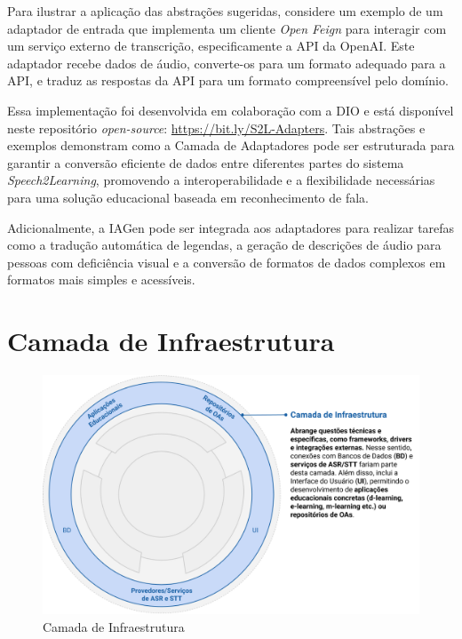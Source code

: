 Para ilustrar a aplicação das abstrações sugeridas, considere um exemplo de um adaptador de entrada que implementa um cliente \textit{Open Feign} para interagir com um serviço externo de transcrição, especificamente a API da OpenAI. Este adaptador recebe dados de áudio, converte-os para um formato adequado para a API, e traduz as respostas da API para um formato compreensível pelo domínio. 

Essa implementação foi desenvolvida em colaboração com a DIO e está disponível neste repositório \textit{open-source}: \url{https://bit.ly/S2L-Adapters}. Tais abstrações e exemplos demonstram como a Camada de Adaptadores pode ser estruturada para garantir a conversão eficiente de dados entre diferentes partes do sistema \textit{Speech2Learning}, promovendo a interoperabilidade e a flexibilidade necessárias para uma solução educacional baseada em reconhecimento de fala.

Adicionalmente, a IAGen pode ser integrada aos adaptadores para realizar tarefas como a tradução automática de legendas, a geração de descrições de áudio para pessoas com deficiência visual e a conversão de formatos de dados complexos em formatos mais simples e acessíveis.

\section{Camada de Infraestrutura}

\begin{figure}[htb]
\centering
\caption{Camada de Infraestrutura}
\label{fig:chapter3-speech2learning-layer4}
\includegraphics[width=1\textwidth]{images/chapter3-speech2learning-layer4.png}
\end{figure}

